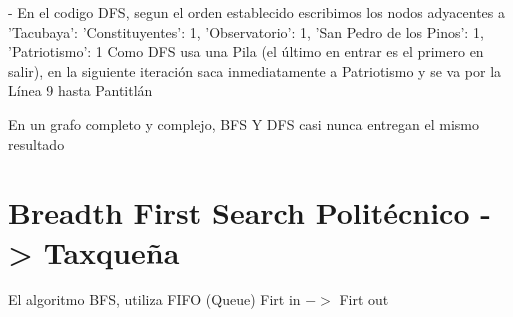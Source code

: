 \documentclass[10pt,a4paper]{article}
\begin{document}
\vspace{3mm}

\begin{alerta}{-}
    En el codigo DFS, segun el orden establecido escribimos los nodos adyacentes a 
    'Tacubaya': {'Constituyentes': 1, 'Observatorio': 1, 'San Pedro de los Pinos': 1, 'Patriotismo': 1}
    Como DFS usa una Pila (el último en entrar es el primero en salir), en la siguiente iteración saca inmediatamente a Patriotismo y se va por la Línea 9 hasta Pantitlán

    En un grafo completo y complejo, BFS Y DFS casi nunca entregan el mismo resultado
\end{alerta}



\newpage

\section{Breadth First Search Politécnico -> Taxqueña}

\vspace{3mm}

El algoritmo BFS, utiliza FIFO (Queue) Firt in \(->\) Firt out
\end{document}
